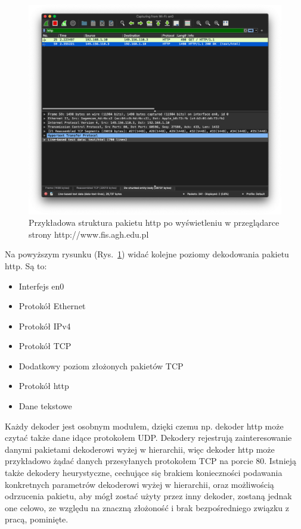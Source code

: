 \documentclass[a4paper, 12pt, twoside, openright]{article}
\begin{document}
	\begin{figure}[ht]
		\centering
			\includegraphics[width=1.0\textwidth]{img/screenshot_fis.png}
		\caption{Przykładowa struktura pakietu http po wyświetleniu w przeglądarce strony http://www.fis.agh.edu.pl}
		\label{fig:fis}
	\end{figure}

	Na powyższym rysunku (Rys.~\ref{fig:fis}) widać kolejne poziomy dekodowania pakietu http. Są to:

	\begin{itemize}
		\item Interfejs en0
		\item Protokół Ethernet
		\item Protokół IPv4
		\item Protokół TCP
		\item Dodatkowy poziom złożonych pakietów TCP
		\item Protokół http
		\item Dane tekstowe
	\end{itemize}

	Każdy dekoder jest osobnym modułem, dzięki czemu np. dekoder http może czytać także dane idące protokołem UDP.
	Dekodery rejestrują zainteresowanie danymi pakietami dekoderowi wyżej w hierarchii, więc dekoder http może przykładowo
	żądać danych przesyłanych protokołem TCP na porcie 80. Istnieją także dekodery heurystyczne, cechujące się brakiem
	konieczności podawania konkretnych parametrów dekoderowi wyżej w hierarchii, oraz możliwością odrzucenia pakietu,
	aby mógł zostać użyty przez inny dekoder, zostaną jednak one celowo, ze względu na znaczną złożoność i brak bezpośredniego
	związku z pracą, pominięte.
\end{document}
